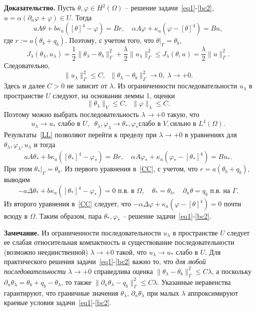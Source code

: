 \documentclass[12pt]{article}
\begin{document}
    {\bf Доказательство.}
    Пусть $\theta,\varphi\in H^2(\Omega)$ -- решение задачи~\eqref{eq1}-\eqref{bc2},
    $u=\alpha(\partial_n\varphi+\varphi)\in U.$ Тогда
    \[
        a A \theta + b \kappa_a ([\theta]^4 - \varphi ) = Br,\quad
        \alpha A \varphi + \kappa_a (\varphi - [\theta]^4)  = Bu,
    \]
    где $r:=a(\theta_b+q_b).$ Поэтому, с учетом того, что $\theta|_\Gamma=\theta_b$,
    \[
        J_\lambda(\theta_\lambda, u_\lambda) = \frac{1}{2}\|\theta_\lambda -\theta_b\|^2_\Gamma
        + \frac{\lambda}{2}\|u_\lambda\|^2_\Gamma\leq J_\lambda(\theta, u)=\frac{\lambda}{2}\|u\|^2_\Gamma.
    \]
    Следовательно,
    \[
        \|u_\lambda\|^2_\Gamma\leq C,\;\; \|\theta_\lambda -\theta_b\|^2_\Gamma\to 0,\; \lambda\to +0.
    \]
    Здесь и далее $C>0$ не зависит от $\lambda.$
    Из ограниченности последовательности $u_\lambda$ в пространстве $U$ следуют, на основании
    леммы 1, оценки
    \[
        \|\theta_\lambda\|_V \leq C,\;\;
        \|\varphi\|_\lambda \leq C.
    \]
    Поэтому можно выбрать последовательность $\lambda\to+0$ такую, что
    \begin{equation}
        \label{LL}
        u_\lambda \rightarrow u_* \text{  слабо в } U, \;\;
        \theta_\lambda, \varphi_\lambda \rightarrow \theta_*,\varphi_* \text{
        слабо в } V, \text{
        сильно в } L^4(\Omega).
    \end{equation}
    Результаты~\eqref{LL} позволяют перейти к пределу при $\lambda\to+0$
    в уравнениях для $\theta_\lambda,\varphi_\lambda,u_\lambda$ и тогда
    \begin{equation}
        \label{CC}
        a A \theta_* + b \kappa_a ([\theta_*]^4 - \varphi_* ) = Br,\quad
        \alpha A \varphi_* + \kappa_a (\varphi_* - [\theta_*]^4)  = Bu_*.
    \end{equation}
    При этом $\theta_*|_\Gamma=\theta_b.$
    Из первого уравнения в~\eqref{CC}, с учетом, что $r=a(\theta_b+q_b)$,
    выводим
    \[
        - a\Delta\theta_* + b\kappa_a([\theta_*]^4- \varphi_*)=0 \text{ п.в. в }\Omega,
        \quad \theta_*=\theta_b,\quad \partial_n\theta = q_b \text{ п.в. на  }\Gamma.
    \]
    Из второго уравнения в~\eqref{CC} следует, что $-\alpha \Delta \varphi +
    \kappa_a(\varphi-[\theta]^4)=0$ почти всюду в $\Omega.$ Таким образом,
    пара $\theta_*,\varphi_*$ -- решение задачи~\eqref{eq1}-\eqref{bc2}.

    \textbf{Замечание.} Из ограниченности последовательности $u_\lambda$ в пространстве $U$ следует
    ее слабая относительная компактность и существование последовательности (возможно неединственной) $\lambda\to+0$ такой, что
    $u_\lambda \rightarrow u_*$ слабо в $U$.
    Для практического решения задачи~\eqref{eq1}-\eqref{bc2} важно то, что \textit{для любой последовательности} $\lambda\to+0$ справедлива оценка
    $\|\theta_\lambda -\theta_b\|^2_\Gamma\leq C\lambda$, а поскольку $\partial_n\theta_\lambda=\theta_b+q_b-\theta_\lambda$, то также $\|\partial_n\theta_\lambda-q_b\|^2_\Gamma\leq C\lambda$.
    Указанные неравенства гарантируют, что граничные значения $\theta_\lambda,\,\partial_n\theta_\lambda$
    при малых $\lambda$
    аппроксимируют краевые условия задачи~\eqref{eq1}-\eqref{bc2}.
\end{document}
